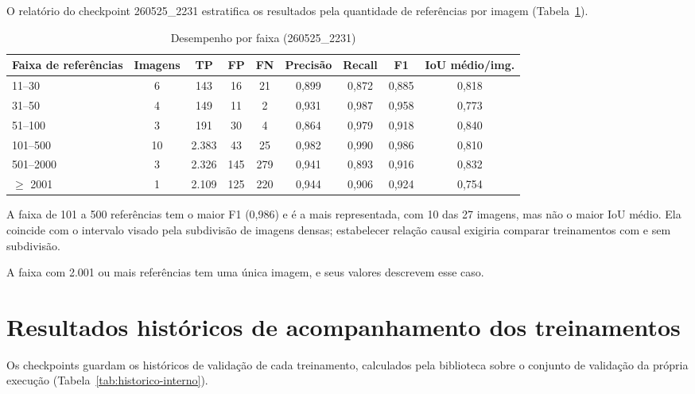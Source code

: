 O relat\'orio do checkpoint 260525\_2231 estratifica os resultados pela quantidade de refer\^encias por imagem (Tabela~\ref{tab:desempenho-faixa}).

\begin{table}[htb]
\centering
\caption{Desempenho por faixa (260525\_2231)}
\label{tab:desempenho-faixa}
\small
\begin{tabular}{lcccccccc}
\hline
\textbf{Faixa de refer\^encias} & \textbf{Imagens} & \textbf{TP} & \textbf{FP} & \textbf{FN} & \textbf{Precis\~ao} & \textbf{Recall} & \textbf{F1} & \textbf{IoU m\'edio/img.} \\
\hline
11--30 & 6 & 143 & 16 & 21 & 0,899 & 0,872 & 0,885 & 0,818 \\
31--50 & 4 & 149 & 11 & 2 & 0,931 & 0,987 & 0,958 & 0,773 \\
51--100 & 3 & 191 & 30 & 4 & 0,864 & 0,979 & 0,918 & 0,840 \\
101--500 & 10 & 2.383 & 43 & 25 & 0,982 & 0,990 & 0,986 & 0,810 \\
501--2000 & 3 & 2.326 & 145 & 279 & 0,941 & 0,893 & 0,916 & 0,832 \\
$\geq$ 2001 & 1 & 2.109 & 125 & 220 & 0,944 & 0,906 & 0,924 & 0,754 \\
\hline
\end{tabular}
\end{table}

A faixa de 101 a 500 refer\^encias tem o maior F1 (0,986) e \'e a mais representada, com 10 das 27 imagens, mas n\~ao o maior IoU m\'edio. Ela coincide com o intervalo visado pela subdivis\~ao de imagens densas; estabelecer rela\c{c}\~ao causal exigiria comparar treinamentos com e sem subdivis\~ao.

A faixa com 2.001 ou mais refer\^encias tem uma \'unica imagem, e seus valores descrevem esse caso.

\section{Resultados hist\'oricos de acompanhamento dos treinamentos}
\label{sec:resultados-historicos-acompanhamento}

Os checkpoints guardam os hist\'oricos de valida\c{c}\~ao de cada treinamento, calculados pela biblioteca sobre o conjunto de valida\c{c}\~ao da pr\'opria execu\c{c}\~ao (Tabela~\ref{tab:historico-interno}).

